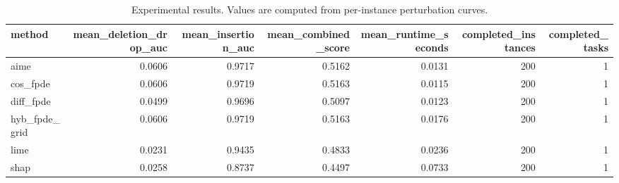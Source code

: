 \begin{table}[t]
\caption{Experimental results. Values are computed from per-instance perturbation curves.}
\label{tab:main_results_computed}
\centering
\begin{tabular}{lrrrrrr}
\toprule
method & mean\_deletion\_drop\_auc & mean\_insertion\_auc & mean\_combined\_score & mean\_runtime\_seconds & completed\_instances & completed\_tasks \\
\midrule
aime & 0.0606 & 0.9717 & 0.5162 & 0.0131 & 200 & 1 \\
cos\_fpde & 0.0606 & 0.9719 & 0.5163 & 0.0115 & 200 & 1 \\
diff\_fpde & 0.0499 & 0.9696 & 0.5097 & 0.0123 & 200 & 1 \\
hyb\_fpde\_grid & 0.0606 & 0.9719 & 0.5163 & 0.0176 & 200 & 1 \\
lime & 0.0231 & 0.9435 & 0.4833 & 0.0236 & 200 & 1 \\
shap & 0.0258 & 0.8737 & 0.4497 & 0.0733 & 200 & 1 \\
\bottomrule
\end{tabular}

\end{table}
